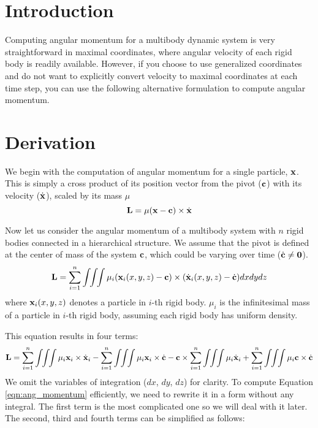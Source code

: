 \section{Introduction}
Computing angular momentum for a multibody dynamic system is very
straightforward in maximal coordinates, where angular velocity of each
rigid body is readily available. However, if you choose to use
generalized coordinates and do not want to explicitly convert velocity
to maximal coordinates at each time step, you can use the following
alternative formulation to compute angular momentum.

\section{Derivation}
We begin with the computation of angular momentum for a single
particle, $\mathbf{x}$. This is simply a cross product of its position
vector from the pivot ($\mathbf{c}$) with its velocity ($\dot{\mathbf{x}}$),
scaled by its mass $\mu$
\begin{equation}
\mathbf{L} = \mu (\mathbf{x} - \mathbf{c}) \times \dot{\mathbf{x}}
\end{equation}

Now let us consider the angular momentum of a multibody system with
$n$ rigid bodies connected in a hierarchical structure. We assume that
the pivot is defined at the center of mass of the system $\mathbf{c}$,
which could be varying over time ($\dot{\mathbf{c}} \neq \mathbf{0}$).
\begin{equation}
\mathbf{L} = \sum_{i=1}^n \int \!\! \int \!\! \int \mu_i (\mathbf{x}_i(x, y, z) - \mathbf{c})
\times (\dot{\mathbf{x}}_i(x, y, z) - \dot{\mathbf{c}}) dxdydz
\end{equation}
where $\mathbf{x}_i(x, y, z)$ denotes a particle in $i$-th rigid body. $\mu_i$ is
the infinitesimal mass of a particle in $i$-th rigid body, assuming
each rigid body has uniform density.

This equation results in four terms:
\begin{equation}
\vc{L} = \sum_{i=1}^n \int \!\! \int \!\! \int \mu_i \vc{x}_i \times
\dot{\vc{x}}_i - \sum_{i=1}^n \int \!\! \int \!\! \int \mu_i \vc{x}_i \times
\dot{\vc{c}} - \vc{c} \times \sum_{i=1}^n \int \!\! \int \!\! \int \mu_i
\dot{\vc{x}}_i + \sum_{i=1}^n \int \!\! \int \!\! \int \mu_i \vc{c}
\times \dot{\vc{c}}
\label{eqn:ang_momentum}
\end{equation}
We omit the variables of integration (\ie $dx$, $dy$, $dz$) for clarity. To
compute Equation \ref{eqn:ang_momentum} efficiently, we need to rewrite it in a form
without any integral. The first term is the most complicated one so we
will deal with it later. The second, third and fourth terms can be
simplified as follows:

